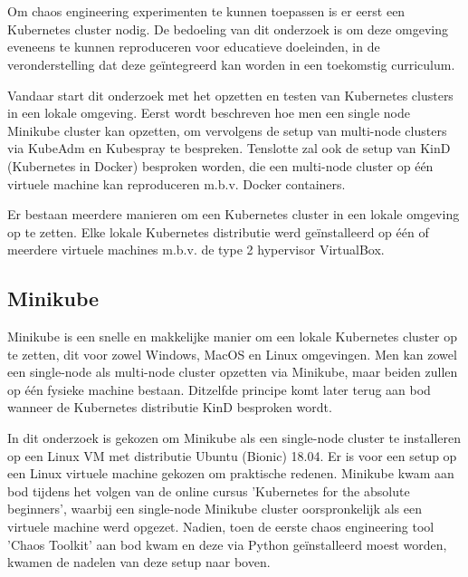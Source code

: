
\chapter{}
\label{ch:lokaleclusters}

Om chaos engineering experimenten te kunnen toepassen is er eerst een Kubernetes cluster nodig. De bedoeling van dit onderzoek is om deze omgeving eveneens te kunnen reproduceren voor educatieve doeleinden, in de veronderstelling dat deze geïntegreerd kan worden in een toekomstig curriculum.

Vandaar start dit onderzoek met het opzetten en testen van Kubernetes clusters in een lokale omgeving. 
Eerst wordt beschreven hoe men een single node Minikube cluster kan opzetten, om vervolgens de setup van multi-node clusters via KubeAdm en Kubespray te bespreken. Tenslotte zal ook de setup van KinD (Kubernetes in Docker) besproken worden, die een multi-node cluster op één virtuele machine kan reproduceren m.b.v. Docker containers.

Er bestaan meerdere manieren om een Kubernetes cluster in een lokale omgeving op te zetten. 
Elke lokale Kubernetes distributie werd geïnstalleerd op één of meerdere virtuele machines m.b.v. de type 2 hypervisor VirtualBox. 

\section{Minikube}

Minikube is een snelle en makkelijke manier om een lokale Kubernetes cluster op te zetten, dit voor zowel Windows, MacOS en Linux omgevingen.  \autocite{Minikube2022} Men kan zowel een single-node als multi-node cluster opzetten via Minikube, maar beiden zullen op één fysieke machine bestaan. Ditzelfde principe komt later terug aan bod wanneer de Kubernetes distributie KinD besproken wordt. 

In dit onderzoek is gekozen om Minikube als een single-node cluster te installeren op een Linux VM met distributie Ubuntu (Bionic) 18.04. Er is voor een setup op een Linux virtuele machine gekozen om praktische redenen. Minikube kwam aan bod tijdens het volgen van de online cursus 'Kubernetes for the absolute beginners', waarbij een single-node Minikube cluster oorspronkelijk als een virtuele machine werd opgezet. 
Nadien, toen de eerste chaos engineering tool 'Chaos Toolkit' aan bod kwam en deze via Python geïnstalleerd moest worden, kwamen de nadelen van deze setup naar boven.

